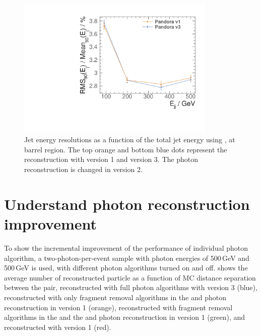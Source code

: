 



\begin{figure}[tbph]
\centering
\includegraphics[width=0.85\textwidth]{photon/JERnew.pdf}
\caption[Jet energy resolution as a function of the di-jet energy]
{Jet energy resolutions as a function of the total jet energy using \eeZuds, at barrel region. The top orange and bottom blue dots represent the  reconstruction with \pandora version 1 and version 3. The photon reconstruction is changed in \pandora version 2.}
\label{fig:photonJER}
\end{figure}


\section{Understand photon reconstruction improvement}





To show the incremental improvement of the performance of individual photon algorithm, a two-photon-per-event sample with photon energies of  500\,GeV and 500\,GeV is used, with different photon algorithms turned on and off.  shows the average number of reconstructed particle as a function of MC distance separation between the pair, reconstructed with full photon algorithms with \pandora version 3 (blue), reconstructed with only fragment removal algorithms in the \ECAL and photon reconstruction in  \pandora version 1 (orange), reconstructed with fragment removal algorithms in the \ECAL and the \HCAL and photon reconstruction in  \pandora version 1 (green), and reconstructed with \pandora version 1 (red).

